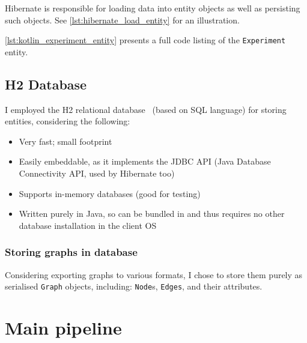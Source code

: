 \begin{itemize}[topsep=5pt,label=$\bm{\rightarrow}$]
    Hibernate is responsible for loading data into entity objects as well as persisting such objects.
    See \autoref{lst:hibernate_load_entity} for an illustration.

    
\end{itemize}


\autoref{lst:kotlin_experiment_entity} presents a full code listing of the \texttt{Experiment} entity.



\subsection{H2 Database}

I employed the H2 relational database~\cite{MuellerH2DatabaseEngine2006} (based on SQL language) for storing entities, considering the following:
\begin{itemize}[topsep=5pt]
    \item Very fast; small footprint
    \item Easily embeddable, as it implements the JDBC API (Java Database Connectivity API, used by Hibernate too)
    \item Supports in-memory databases (good for testing)
    \item Written purely in Java, so can be bundled in \graffs and thus requires no other database installation in the client OS
\end{itemize}

\subsubsection*{Storing graphs in database}

Considering exporting graphs to various formats, I chose to store them purely as serialised \texttt{Graph} objects, including: \texttt{Node}s, \texttt{Edges}, and their attributes.


\section{Main pipeline}\label{sec:main_pipeline}

